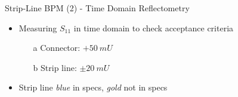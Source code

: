 \documentclass{beamer}
\begin{document}
\begin{frame}[t,fragile]{Strip-Line BPM (2) - Time Domain Reflectometry}
\begin{itemize}
\item Measuring $S_{11}$ in time domain to check acceptance criteria
\begin{itemize}
\item[a] Connector: $+\SI{50}{mU}$ 
\item[b] Strip line: $\pm\SI{20}{mU}$
\end{itemize}
\item Strip line \textit{blue} in specs, \textit{gold} not in specs
\end{itemize}

\begin{figure}
  \centering
  \quad
  \\
\end{figure}

\end{frame}
\end{document}

